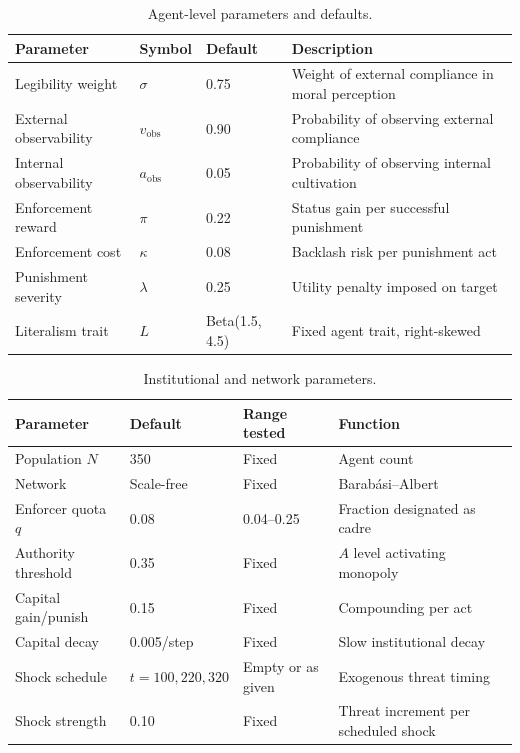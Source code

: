 \documentclass[12pt]{article}
\begin{document}
\begin{table}[ht]
\centering
\caption{Agent-level parameters and defaults.}
\label{tab:agent-params}
\begin{tabular}{llll}
\toprule
Parameter & Symbol & Default & Description \\
\midrule
Legibility weight & $\sigma$ & 0.75 & Weight of external compliance in moral perception \\
External observability & $v_{\text{obs}}$ & 0.90 & Probability of observing external compliance \\
Internal observability & $a_{\text{obs}}$ & 0.05 & Probability of observing internal cultivation \\
Enforcement reward & $\pi$ & 0.22 & Status gain per successful punishment \\
Enforcement cost & $\kappa$ & 0.08 & Backlash risk per punishment act \\
Punishment severity & $\lambda$ & 0.25 & Utility penalty imposed on target \\
Literalism trait & $L$ & Beta(1.5, 4.5) & Fixed agent trait, right-skewed \\
\bottomrule
\end{tabular}
\end{table}

\begin{table}[ht]
\centering
\caption{Institutional and network parameters.}
\label{tab:inst-params}
\begin{tabular}{llll}
\toprule
Parameter & Default & Range tested & Function \\
\midrule
Population $N$ & 350 & Fixed & Agent count \\
Network & Scale-free & Fixed & Barab\'asi--Albert \\
Enforcer quota $q$ & 0.08 & 0.04--0.25 & Fraction designated as cadre \\
Authority threshold & 0.35 & Fixed & $A$ level activating monopoly \\
Capital gain/punish & 0.15 & Fixed & Compounding per act \\
Capital decay & 0.005/step & Fixed & Slow institutional decay \\
Shock schedule & $t = 100, 220, 320$ & Empty or as given & Exogenous threat timing \\
Shock strength & 0.10 & Fixed & Threat increment per scheduled shock \\
\bottomrule
\end{tabular}
\end{table}
\end{document}

